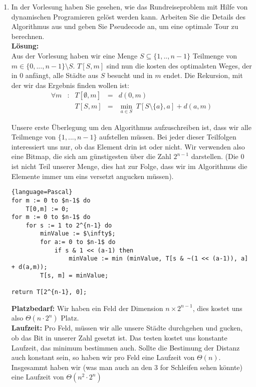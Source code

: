 \documentclass[11pt,a4paper,ngerman]{article}
\begin{document}
\begin{enumerate}[\bfseries (a)]
\item In der Vorlesung haben Sie gesehen, wie das Rundreiseproblem mit Hilfe von dynamischen Programieren gelöst werden kann. Arbeiten Sie die Details des Algorithmus aus und geben Sie Pseudecode an, um eine optimale Tour zu berechnen.\\

\textbf{Lösung:}\\

Aus der Vorlesung haben wir eine Menge $S \subseteq \{1,..,n-1 \}$ Teilmenge von $m \in \{ 0, ... , n-1\} \setminus S$. $T[S , m]$ sind nun die kosten des optimalsten Weges, der in 0 anfängt, alle Städte aus $S$ besucht und in $m$ endet. Die Rekursion, mit der wir das Ergebnis finden wollen ist:
$$
\begin{array}{lcrcl}
\forall m &:& T[\emptyset , m] &=& d(0,m)\\
&& T[ S,m ] &=& \underset{a\in S}{\min} \; T[S \setminus \{ a \} , a] + d(a,m)
\end{array}
$$

Unsere erste Überlegung um den Algorithmus aufzuschreiben ist, dass wir alle Teilmenge von $\{ 1, ... , n-1 \}$ aufstellen müssen. Bei jeder dieser Teilfolgen interessiert uns nur, ob das Element drin ist oder nicht. Wir verwenden also eine Bitmap, die sich am günstigesten über die Zahl $2^{n-1}$ darstellen. (Die 0 ist nicht Teil unserer Menge, dies hat zur Folge, dass wir im Algorithmus die Elemente immer um eins versetzt angucken müssen).

\begin{lstlisting}{language=Pascal}
for m := 0 to $n-1$ do
	T[0,m] := 0;
for m := 0 to $n-1$ do
	for s := 1 to 2^{n-1} do
		minValue := $\infty$;
		for a:= 0 to $n-1$ do
			if s & 1 << (a-1) then
				minValue := min (minValue, T[s & ~(1 << (a-1)), a] + d(a,m));
		T[s, m] = minValue;

return T[2^{n-1}, 0];
\end{lstlisting}

\textbf{Platzbedarf:} Wir haben ein Feld der Dimension $n \times 2^{n-1}$, dies kostet uns also $\Theta (n \cdot 2^n)$ Platz.\\
\textbf{Laufzeit:} Pro Feld, müssen wir alle unsere Städte durchgehen und gucken, ob das Bit in unserer Zahl gesetzt ist. Das testen kostet uns konstante Laufzeit, das minimum bestimmen auch. Sollte die Bestimung der Distanz auch konstant sein, so haben wir pro Feld eine Laufzeit von $\Theta (n)$.\\
Insgesammt haben wir (was man auch an den 3 for Schleifen sehen könnte) eine Laufzeit von $\Theta (n^2 \cdot 2^n)$

\end{enumerate}
\end{document}
